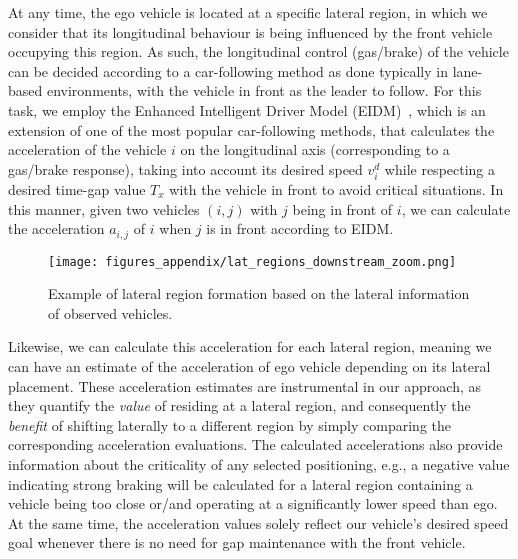 At any time, the ego vehicle is located at a specific lateral region, in which we consider that its longitudinal behaviour is being influenced by the front vehicle occupying this region.
As such, the longitudinal control (gas/brake) of the vehicle can be decided according to a car-following method as done typically in lane-based environments, with the vehicle in front as the leader to follow.
For this task, we employ the Enhanced Intelligent Driver Model (EIDM)~\cite{kesting2010enhanced}, which is an extension of one of the most popular car-following methods, that calculates the acceleration of the vehicle $i$ on the longitudinal axis (corresponding to a gas/brake response), taking into account its desired speed $v_i^d$ while respecting a desired time-gap value $T_x$ with the vehicle in front to avoid critical situations.
In this manner, given two vehicles $(i,j)$ with $j$ being in front of $i$, we can calculate the acceleration $a_{i, j}$ of $i$ when $j$ is in front according to EIDM.


\begin{figure}[b]
    \centering
    \texttt{[image: figures\_appendix/lat\_regions\_downstream\_zoom.png]}
    \caption{Example of lateral region formation based on the lateral information of observed vehicles.}
    \label{fig:lat_regions_detail}
\end{figure}

Likewise, we can calculate this acceleration for each lateral region, meaning we can have an estimate of the acceleration of ego vehicle depending on its lateral placement.
These acceleration estimates are instrumental in our approach, as they quantify the {\em value} of residing at a lateral region, and consequently the {\em benefit} of shifting laterally to a different region by simply comparing the corresponding acceleration evaluations.
The calculated accelerations also provide information about the criticality of any selected positioning, e.g., a negative value indicating strong braking will be calculated for a lateral region containing a vehicle being too close or/and operating at a significantly lower speed than ego.
At the same time, the acceleration values solely reflect our vehicle's desired speed goal whenever there is no need for gap maintenance with the front vehicle.


